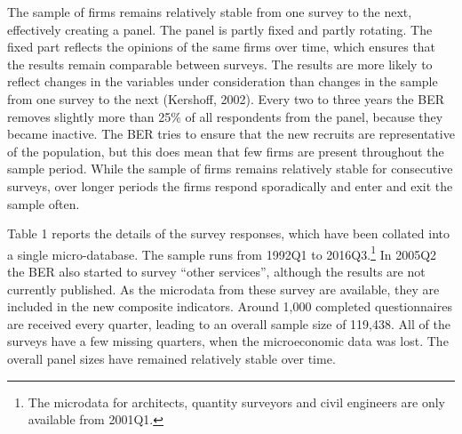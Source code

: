 \documentclass[11pt,]{article}
\let\rmarkdownfootnote\footnote%
\def\footnote{\protect\rmarkdownfootnote}
\begin{document}
The sample of firms remains relatively stable from one survey to the
next, effectively creating a panel. The panel is partly fixed and partly
rotating. The fixed part reflects the opinions of the same firms over
time, which ensures that the results remain comparable between surveys.
The results are more likely to reflect changes in the variables under
consideration than changes in the sample from one survey to the next
(Kershoff, 2002). Every two to three years the BER removes slightly more
than 25\% of all respondents from the panel, because they became
inactive. The BER tries to ensure that the new recruits are
representative of the population, but this does mean that few firms are
present throughout the sample period. While the sample of firms remains
relatively stable for consecutive surveys, over longer periods the firms
respond sporadically and enter and exit the sample often.

Table 1 reports the details of the survey responses, which have been
collated into a single micro-database. The sample runs from 1992Q1 to
2016Q3.\footnote{The microdata for architects, quantity surveyors and
  civil engineers are only available from 2001Q1.} In 2005Q2 the BER
also started to survey ``other services'', although the results are not
currently published. As the microdata from these survey are available,
they are included in the new composite indicators. Around 1,000
completed questionnaires are received every quarter, leading to an
overall sample size of 119,438. All of the surveys have a few missing
quarters, when the microeconomic data was lost. The overall panel sizes
have remained relatively stable over time.

\begin{table}[ht]
\centering
\caption{Sample characteristics} 
\end{table}
\end{document}
